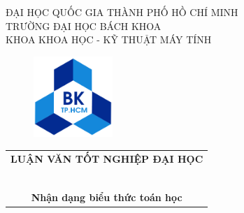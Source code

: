 \documentclass[a4paper]{article}
\theoremstyle{definition}
\begin{document}
	\begin{titlepage}
		
		\begin{center}
			ĐẠI HỌC QUỐC GIA THÀNH PHỐ HỒ CHÍ MINH \\
			TRƯỜNG ĐẠI HỌC BÁCH KHOA\\
			KHOA KHOA HỌC - KỸ THUẬT MÁY TÍNH\\
			
		\end{center}
		\vspace{1cm}
		
		\begin{figure}[h!]
			\begin{center}
				\includegraphics[width=3cm]{Images/hcmut.png}
			\end{center}
		\end{figure}
		\vspace{1cm}
		
		\begin{center}
			\begin{tabular}{c}
				\multicolumn{1}{c}{\textbf{{LUẬN VĂN TỐT NGHIỆP ĐẠI HỌC}}}\\
				~~\\
				\hline
				\\
				\multicolumn{1}{c}{\textbf{{\Large
							Nhận dạng biểu thức toán học
				}}}\\
				
			\end{tabular}
		\end{center}
		
		\vspace{1cm}
		

\end{titlepage}
\end{document}

